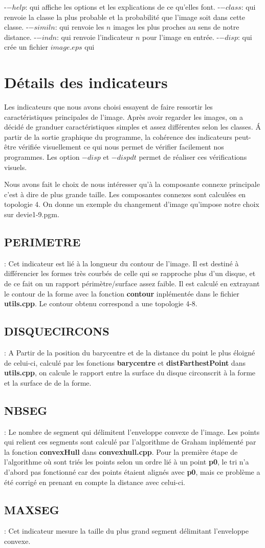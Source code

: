 \documentclass{report}
\begin{document}
\noindent-$-help$: qui affiche les options et les explications de ce qu'elles font.
\noindent-$-class$: qui renvoie la classe la plus probable et la probabilité que l'image soit dans cette classe.
\noindent-$-simil n$: qui renvoie les $n$ images les plus proches au sens de notre distance.
\noindent-$-indn$: qui renvoie l'indicateur $n$ pour l'image en entrée.
\noindent-$-disp$: qui crée un fichier $image.eps$ qui 


\chapter{Détails des indicateurs}
Les indicateurs que nous avons choisi essayent de faire ressortir les caractéristiques principales de l'image.
Après avoir regarder les images, on a décidé de granduer caractéristiques simples et assez différentes selon les classes.
\'A partir de la sortie graphique du programme, la cohérence des indicateurs peut-être vérifiée visuellement ce 
qui nous permet de vérifier facilement nos programmes. Les option $-disp$ et $-dispdt$ permet de réaliser ces vérifications
visuels.

Nous avons fait le choix de nous intéresser qu'à la composante connexe principale c'est à dire de plus grande taille.
Les composantes connexes sont calculées en topologie 4.
On donne un exemple du changement d'image qu'impose notre choix sur devie1-9.pgm. 

\section{PERIMETRE} : Cet indicateur est lié à la longueur du contour de l'image. Il est destiné à différencier les formes très courbés de celle qui se rapproche plus d'un disque, et de ce fait on un rapport périmètre/surface assez faible. Il est calculé en extrayant le contour de la forme avec la fonction \textbf{contour} inplémentée dans le fichier \textbf{utils.cpp}. Le contour obtenu correspond a une topologie 4-8.
\section{DISQUECIRCONS} : A Partir de la position du barycentre et de la distance du point le plus éloigné de celui-ci, calculé par les fonctions \textbf{barycentre} et \textbf{distFarthestPoint} dans \textbf{utils.cpp}, on calcule le rapport entre la surface du disque circonscrit à la forme et la surface de de la forme.
\section{NBSEG} : Le nombre de segment qui délimitent l'enveloppe convexe de l'image. Les points qui relient ces segments sont calculé par l'algorithme de Graham inplémenté par la fonction \textbf{convexHull} dans \textbf{convexhull.cpp}. Pour la première étape de l'algorithme où sont triés les points selon un ordre lié à un point \textbf{p0}, le tri n'a d'abord pas fonctionné car des points étaient alignés avec \textbf{p0}, mais ce problème a été corrigé en prenant en compte la distance avec celui-ci.
\section{MAXSEG} : Cet indicateur mesure la taille du plus grand segment délimitant l'enveloppe convexe.
\end{document}
